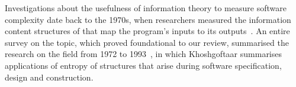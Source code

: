 \documentclass[10pt,conference]{IEEEtran}
\begin{document}

Investigations about the usefulness of information theory to measure software complexity date back to the 1970s, when researchers measured the information content structures of that map the program's inputs to its outputs~\cite{hellerman1972lookup}. An entire survey on the topic, which proved foundational to our review, summarised the research on the field from 1972 to 1993~\cite{Khoshgoftaar1994ApplicationsOI}, in which Khoshgoftaar summarises applications of entropy of structures that arise during software specification, design and construction.

\end{document}
